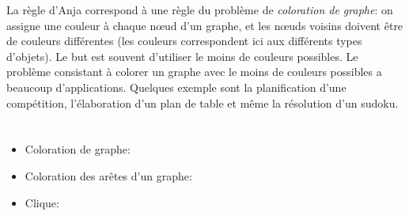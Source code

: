 {{La règle d’Anja correspond à une règle du problème de \emph{coloration de graphe}: on assigne une couleur à chaque nœud d’un graphe, et les nœuds voisins doivent être de couleurs différentes (les couleurs correspondent ici aux différents types d’objets). Le but est souvent d’utiliser le moins de couleurs possibles. Le problème consistant à colorer un graphe avec le moins de couleurs possibles a beaucoup d’applications. Quelques exemple sont la planification d’une compétition, l’élaboration d’un plan de table et même la résolution d’un sudoku.



\section*{\BrochureWebsitesAndKeywords}
{\raggedright
\begin{itemize}
  \item Coloration de graphe: \href{https://fr.wikipedia.org/wiki/Coloration_de_graphe}{}
  \item Coloration des arêtes d’un graphe: \href{https://fr.wikipedia.org/wiki/Coloration_des_ar\%C3\%AAtes_d\%27un_graphe}{}
  \item Clique: \href{https://fr.wikipedia.org/wiki/Clique_(th\%C3\%A9orie_des_graphes)}{}
\end{itemize}


}

}{}

\def\AuthorDatzkoS{} %
\def\AuthorHromkovicJ{} %
\def\AuthorLacherR{} %
\def\AuthorDatzkoC{} %
\def\AuthorChanS{} %
\def\AuthorSchrijversE{} %
\def\AuthorFreiF{} %
\def\AuthorPluharZ{} %
\def\AuthorPohlW{} %
\def\AuthorPelletE{} %

\newpage}{}
